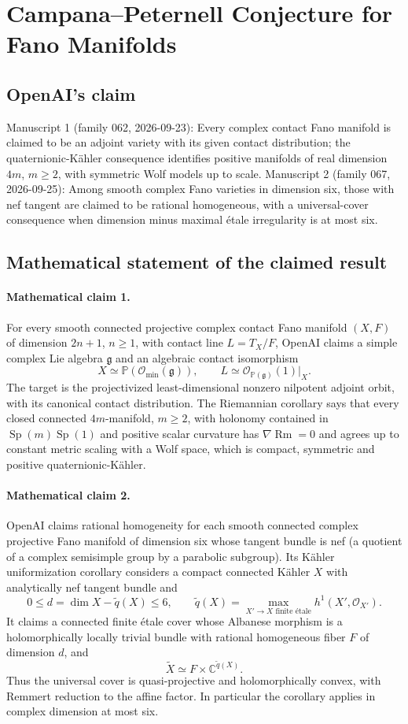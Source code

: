 \documentclass[11pt]{article}
\begin{document}
\section*{Campana–Peternell Conjecture for Fano Manifolds}

\subsection{OpenAI's claim}
Manuscript 1 (family 062, 2026-09-23): Every complex contact Fano manifold is claimed to be an adjoint variety with its given contact distribution; the quaternionic-Kähler consequence identifies positive manifolds of real dimension $4m$, $m\ge2$, with symmetric Wolf models up to scale. Manuscript 2 (family 067, 2026-09-25): Among smooth complex Fano varieties in dimension six, those with nef tangent are claimed to be rational homogeneous, with a universal-cover consequence when dimension minus maximal étale irregularity is at most six.

\subsection{Mathematical statement of the claimed result}
\paragraph{Mathematical claim 1.} For every smooth connected projective complex contact Fano manifold $(X,F)$ of dimension $2n+1$, $n\ge1$, with contact line $L=T_X/F$, OpenAI claims a simple complex Lie algebra $\mathfrak g$ and an algebraic contact isomorphism
\[
X\simeq\mathbb P(\mathcal O_{\min}(\mathfrak g)),\qquad
L\simeq\mathcal O_{\mathbb P(\mathfrak g)}(1)|_X.
\]
The target is the projectivized least-dimensional nonzero nilpotent adjoint orbit, with its canonical contact distribution. The Riemannian corollary says that every closed connected $4m$-manifold, $m\ge2$, with holonomy contained in $\operatorname{Sp}(m)\operatorname{Sp}(1)$ and positive scalar curvature has $\nabla\operatorname{Rm}=0$ and agrees up to constant metric scaling with a Wolf space, which is compact, symmetric and positive quaternionic-Kähler.

\paragraph{Mathematical claim 2.} OpenAI claims rational homogeneity for each smooth connected complex projective Fano manifold of dimension six whose tangent bundle is nef (a quotient of a complex semisimple group by a parabolic subgroup).
Its Kähler uniformization corollary considers a compact connected Kähler $X$ with analytically nef tangent bundle and
\[
0\le d=\dim X-\widetilde q(X)\le6,\qquad
\widetilde q(X)=\max_{X'\to X\text{ finite étale}}h^1(X',\mathcal O_{X'}).
\]
It claims a connected finite étale cover whose Albanese morphism is a holomorphically locally trivial bundle with rational homogeneous fiber $F$ of dimension $d$, and
\[
\widetilde X\simeq F\times\mathbb C^{\widetilde q(X)}.
\]
Thus the universal cover is quasi-projective and holomorphically convex, with Remmert reduction to the affine factor. In particular the corollary applies in complex dimension at most six.
\end{document}
